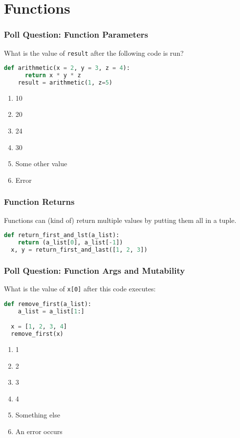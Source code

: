 \documentclass{beamer}
\begin{document}
\section{Functions}
%
%
\begin{frame}[fragile]
  \frametitle{Poll Question: Function Parameters}
  What is the value of \lstinline|result| after the following code is run?
  \begin{lstlisting}[language=Python, autogobble]
    def arithmetic(x = 2, y = 3, z = 4):
      return x * y * z
    result = arithmetic(1, z=5)
  \end{lstlisting}
  \vfill
  \begin{enumerate}[A]
    \item 10
    \item 20
    \item 24
    \item 30
    \item Some other value
    \item Error
  \end{enumerate}
\end{frame}

%
%
\begin{frame}[fragile]
  \frametitle{Function Returns}
  Functions can (kind of) return multiple values by putting them all in a tuple.
  \begin{lstlisting}[language=Python, autogobble]
  def return_first_and_lst(a_list):
    return (a_list[0], a_list[-1])
  x, y = return_first_and_last([1, 2, 3])
  \end{lstlisting}
\end{frame}

%
%
\begin{frame}[fragile]
  \frametitle{Poll Question: Function Args and Mutability}
  What is the value of \lstinline|x[0]| after this code executes:
  \begin{lstlisting}[language=Python, autogobble]
  def remove_first(a_list):
    a_list = a_list[1:]

  x = [1, 2, 3, 4]
  remove_first(x)
  \end{lstlisting}
  \vfill
  \begin{enumerate}[A]
    \item 1
    \item 2
    \item 3
    \item 4
    \item Something else
    \item An error occurs
  \end{enumerate}
\end{frame}
\end{document}
